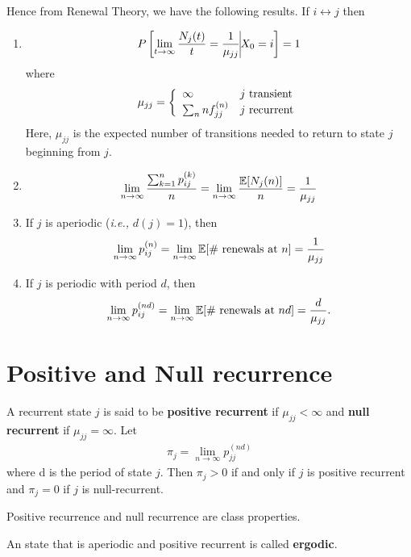 \documentclass[a4paper,10pt,english]{article}
\begin{document}
Hence from Renewal Theory, we have the following results. If $i \leftrightarrow j$ then
\begin{enumerate}
	\item 
	\begin{align*}P\left[ \lim_{t \to \infty} \frac{N_j(t)}{t}= \frac{1}{\mu_{jj}} \vline X_0 = i\right] = 1\end{align*}
	where
 \begin{align*}\mu_{jj} = \left\{\begin{array}{l l}
	\infty & j \mbox{ transient} \\
	\sum_n n f_{jj}^{(n)} & j \mbox{ recurrent}	
	\end{array}\right.\end{align*}
      Here, $\mu_{jj}$ is the expected number of transitions needed to
      return to state $j$ beginning from $j$.
    \item
      \begin{align*}\lim_{n \to \infty} \frac{\sum_{k=1}^n p_{ij}^{(k)}}{n} =
      \lim_{n \to \infty} \frac{\mathbb{E}[N_j(n)] }{n} =
      \frac{1}{\mu_{jj}}\end{align*}

	\item If $j$ is aperiodic (\textit{i.e.,} $d(j)=1$), then \begin{align*} \lim_{n \to \infty} p_{ij}^{(n)} = \lim_{n \to \infty} \mathbb{E}[\# \mbox{ renewals at $n$}]  = \frac{1}{\mu_{jj}}\end{align*}
	\item If $j$ is periodic with period $d$, then \begin{align*} \lim_{n \to \infty} p_{ij}^{(nd)}= \lim_{n \to \infty} \mathbb{E}[\# \mbox{ renewals at $nd$}] = \frac{d}{\mu_{jj}}.\end{align*}
\end{enumerate}

\section{Positive and Null recurrence}
A recurrent state $j$ is said to be \textbf{positive recurrent} if $\mu_{jj} < \infty$ and \textbf{null recurrent} if $\mu_{jj} = \infty$. Let
\begin{align*}\pi_j = \lim_{n \to \infty} p_{jj}^{(nd)}\end{align*}
where d is the period of state $j$. Then $\pi_j > 0$ if and only if $j$ is positive recurrent and $\pi_j = 0$ if  $j$ is null-recurrent. 

\begin{prop}
Positive recurrence and null recurrence are class properties.
\end{prop}
\begin{defn}
An state that is aperiodic and positive recurrent is called \textbf{ergodic}.
\end{defn}
\end{document}
